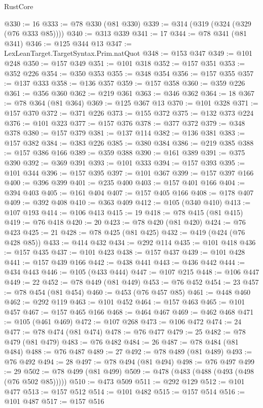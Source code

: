\begin{lexlean}{RustCore}
\begin{coremodule}
@330 := 16
@333 := @78 @330 (@81 @330)
@339 := @314 (@319 (@324 (@329 (@76 @333 @85))))
@340 := @313 @339
@341 := 17
@344 := @78 @341 (@81 @341)
@346 := @125 @344 @13
@347 := LexLeanTarget.TargetSyntax.Prim.natQuot
@348 := @153 @347
@349 := @101 @248
@350 := @157 @349
@351 := @101 @318
@352 := @157 @351
@353 := @352 @226
@354 := @350 @353
@355 := @348 @354
@356 := @157 @355
@357 := @137 @333
@358 := @136 @357
@359 := @157 @358
@360 := @359 @226
@361 := @356 @360
@362 := @219 @361
@363 := @346 @362
@364 := 18
@367 := @78 @364 (@81 @364)
@369 := @125 @367 @13
@370 := @101 @328
@371 := @157 @370
@372 := @371 @226
@373 := @155 @372
@375 := @132 @373 @224
@376 := @101 @323
@377 := @157 @376
@378 := @377 @372
@379 := @348 @378
@380 := @157 @379
@381 := @137 @114
@382 := @136 @381
@383 := @157 @382
@384 := @383 @226
@385 := @380 @384
@386 := @219 @385
@388 := @157 @386 @166
@389 := @359 @388
@390 := @161 @389
@391 := @375 @390
@392 := @369 @391
@393 := @101 @333
@394 := @157 @393
@395 := @101 @344
@396 := @157 @395
@397 := @101 @367
@399 := @157 @397 @166
@400 := @396 @399
@401 := @235 @400
@403 := @157 @401 @166
@404 := @394 @403
@405 := @161 @404
@407 := @157 @405 @166
@408 := @178 @407
@409 := @392 @408
@410 := @363 @409
@412 := @105 (@340 @410)
@413 := @107 @193
@414 := @106 @413
@415 := 19
@418 := @78 @415 (@81 @415)
@419 := @76 @418
@420 := 20
@423 := @78 @420 (@81 @420)
@424 := @76 @423
@425 := 21
@428 := @78 @425 (@81 @425)
@432 := @419 (@424 (@76 @428 @85))
@433 := @414 @432
@434 := @292 @114
@435 := @101 @418
@436 := @157 @435
@437 := @101 @423
@438 := @157 @437
@439 := @101 @428
@441 := @157 @439 @166
@442 := @438 @441
@443 := @436 @442
@444 := @434 @443
@446 := @105 (@433 @444)
@447 := @107 @215
@448 := @106 @447
@449 := 22
@452 := @78 @449 (@81 @449)
@453 := @76 @452
@454 := 23
@457 := @78 @454 (@81 @454)
@460 := @453 (@76 @457 @85)
@461 := @448 @460
@462 := @292 @119
@463 := @101 @452
@464 := @157 @463
@465 := @101 @457
@467 := @157 @465 @166
@468 := @464 @467
@469 := @462 @468
@471 := @105 (@461 @469)
@472 := @107 @268
@473 := @106 @472
@474 := 24
@477 := @78 @474 (@81 @474)
@478 := @76 @477
@479 := 25
@482 := @78 @479 (@81 @479)
@483 := @76 @482
@484 := 26
@487 := @78 @484 (@81 @484)
@488 := @76 @487
@489 := 27
@492 := @78 @489 (@81 @489)
@493 := @76 @492
@494 := 28
@497 := @78 @494 (@81 @494)
@498 := @76 @497
@499 := 29
@502 := @78 @499 (@81 @499)
@509 := @478 (@483 (@488 (@493 (@498 (@76 @502 @85)))))
@510 := @473 @509
@511 := @292 @129
@512 := @101 @477
@513 := @157 @512
@514 := @101 @482
@515 := @157 @514
@516 := @101 @487
@517 := @157 @516

\end{coremodule}
\end{lexlean}
